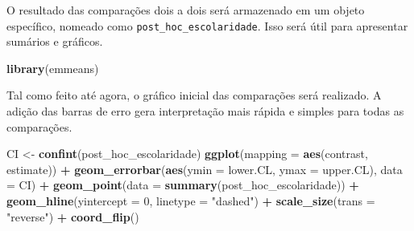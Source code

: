 \documentclass[
]{book}
\newenvironment{Shaded}{\begin{snugshade}}{\end{snugshade}}
\newcommand{\DataTypeTok}[1]{\textcolor[rgb]{0.13,0.29,0.53}{#1}}
\newcommand{\DecValTok}[1]{\textcolor[rgb]{0.00,0.00,0.81}{#1}}
\newcommand{\KeywordTok}[1]{\textcolor[rgb]{0.13,0.29,0.53}{\textbf{#1}}}
\newcommand{\NormalTok}[1]{#1}
\newcommand{\OperatorTok}[1]{\textcolor[rgb]{0.81,0.36,0.00}{\textbf{#1}}}
\newcommand{\OtherTok}[1]{\textcolor[rgb]{0.56,0.35,0.01}{#1}}
\newcommand{\StringTok}[1]{\textcolor[rgb]{0.31,0.60,0.02}{#1}}
\begin{document}
O resultado das comparações dois a dois será armazenado em um objeto específico, nomeado como \texttt{post\_hoc\_escolaridade}. Isso será útil para apresentar sumários e gráficos.

\begin{Shaded}
\begin{Highlighting}[]
\KeywordTok{library}\NormalTok{(emmeans)}
\end{Highlighting}
\end{Shaded}

\begin{Shaded}
\end{Shaded}

Tal como feito até agora, o gráfico inicial das comparações será realizado. A adição das barras de erro gera interpretação mais rápida e simples para todas as comparações.

\begin{Shaded}
\begin{Highlighting}[]
\NormalTok{CI <-}\StringTok{ }\KeywordTok{confint}\NormalTok{(post_hoc_escolaridade)}
\KeywordTok{ggplot}\NormalTok{(}\DataTypeTok{mapping =} \KeywordTok{aes}\NormalTok{(contrast, estimate)) }\OperatorTok{+}
\StringTok{  }\KeywordTok{geom_errorbar}\NormalTok{(}\KeywordTok{aes}\NormalTok{(}\DataTypeTok{ymin =}\NormalTok{ lower.CL, }\DataTypeTok{ymax =}\NormalTok{ upper.CL), }\DataTypeTok{data =}\NormalTok{ CI) }\OperatorTok{+}
\StringTok{  }\KeywordTok{geom_point}\NormalTok{(}\DataTypeTok{data =} \KeywordTok{summary}\NormalTok{(post_hoc_escolaridade)) }\OperatorTok{+}
\StringTok{  }\KeywordTok{geom_hline}\NormalTok{(}\DataTypeTok{yintercept =} \DecValTok{0}\NormalTok{, }\DataTypeTok{linetype =} \StringTok{"dashed"}\NormalTok{) }\OperatorTok{+}\StringTok{ }
\StringTok{  }\KeywordTok{scale_size}\NormalTok{(}\DataTypeTok{trans =} \StringTok{"reverse"}\NormalTok{) }\OperatorTok{+}\StringTok{ }
\StringTok{  }\KeywordTok{coord_flip}\NormalTok{()}
\end{Highlighting}
\end{Shaded}
\end{document}
